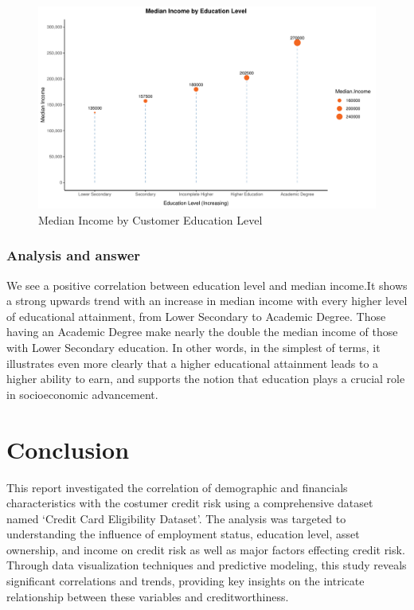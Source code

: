 \documentclass{article}\usepackage[]{graphicx}\usepackage[]{xcolor}
\makeatletter
\def\maxwidth{ %
  \ifdim\Gin@nat@width>\linewidth
    \linewidth
  \else
    \Gin@nat@width
  \fi
}
\newenvironment{knitrout}{}{} %
\makeatother
\begin{document}
\begin{knitrout}
\begin{figure}[H]
\includegraphics[width=\maxwidth]{figure/unnamed-chunk-48-1} \caption[Median Income by Customer Education Level]{Median Income by Customer Education Level}\label{fig:unnamed-chunk-48}
\end{figure}

\end{knitrout}

\subsubsection{Analysis and answer}

We see a positive correlation between education level and median income.It shows a strong upwards trend with an increase in median income with every higher level of educational attainment, from Lower Secondary to Academic Degree. Those having an Academic Degree make nearly the double the median income of those with Lower Secondary education. In other words, in the simplest of terms, it illustrates even more clearly that a higher educational attainment leads to a higher ability to earn, and supports the notion that education plays a crucial role in socioeconomic advancement.


\newpage
\section{Conclusion}

This report investigated the correlation of demographic and financials characteristics with the costumer credit risk using a comprehensive dataset named `Credit Card Eligibility Dataset'. The analysis was targeted to understanding the influence of employment status, education level, asset ownership, and income on credit risk as well as major factors effecting credit risk. Through data visualization techniques and predictive modeling, this study reveals significant correlations and trends, providing key insights on the intricate relationship between these variables and creditworthiness.\\
\end{document}
